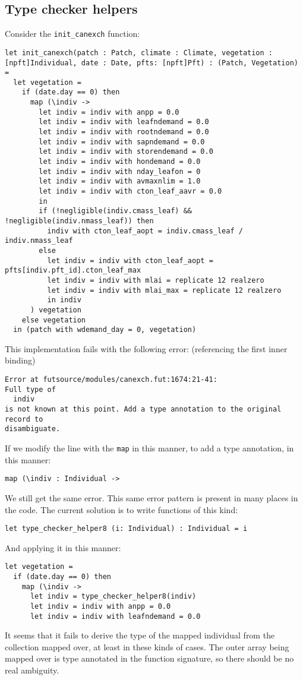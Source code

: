 \subsection{Type checker helpers}
Consider the \texttt{init_canexch} function:
\begin{verbatim}
let init_canexch(patch : Patch, climate : Climate, vegetation : [npft]Individual, date : Date, pfts: [npft]Pft) : (Patch, Vegetation) =
  let vegetation =
    if (date.day == 0) then
      map (\indiv ->
        let indiv = indiv with anpp = 0.0
        let indiv = indiv with leafndemand = 0.0
        let indiv = indiv with rootndemand = 0.0
        let indiv = indiv with sapndemand = 0.0
        let indiv = indiv with storendemand = 0.0
        let indiv = indiv with hondemand = 0.0
        let indiv = indiv with nday_leafon = 0
        let indiv = indiv with avmaxnlim = 1.0
        let indiv = indiv with cton_leaf_aavr = 0.0
        in
        if (!negligible(indiv.cmass_leaf) && !negligible(indiv.nmass_leaf)) then
          indiv with cton_leaf_aopt = indiv.cmass_leaf / indiv.nmass_leaf
        else
          let indiv = indiv with cton_leaf_aopt = pfts[indiv.pft_id].cton_leaf_max
          let indiv = indiv with mlai = replicate 12 realzero
          let indiv = indiv with mlai_max = replicate 12 realzero
          in indiv
      ) vegetation
    else vegetation
  in (patch with wdemand_day = 0, vegetation)
\end{verbatim}
This implementation fails with the following error: (referencing the first inner binding)
\begin{verbatim}
Error at futsource/modules/canexch.fut:1674:21-41:
Full type of
  indiv
is not known at this point. Add a type annotation to the original record to
disambiguate.
\end{verbatim}

If we modify the line with the \texttt{map} in this manner, to add a type annotation, in this manner:

\begin{verbatim}
map (\indiv : Individual ->
\end{verbatim}

We still get the same error. This same error pattern is present in many places in the code. The current solution is to write functions of this kind:

\begin{verbatim}
let type_checker_helper8 (i: Individual) : Individual = i
\end{verbatim}

And applying it in this manner:

\begin{verbatim}
let vegetation =
  if (date.day == 0) then
    map (\indiv ->
      let indiv = type_checker_helper8(indiv)
      let indiv = indiv with anpp = 0.0
      let indiv = indiv with leafndemand = 0.0
\end{verbatim}

It seems that it fails to derive the type of the mapped individual from the collection mapped over, at least in these kinds of cases. The outer array being mapped over is type annotated in the function signature, so there should be no real ambiguity.
